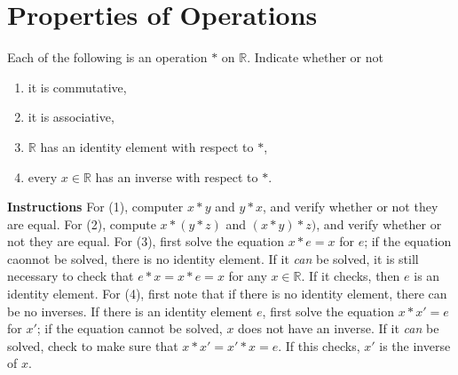 \documentclass[draft,twoside]{amsart}
\newcommand{\Reals}{\mathbb{R}{}}
\begin{document}
\section{Properties of Operations}

Each of the following is an operation $*$ on $\Reals$. Indicate whether or
not
\begin{enumerate}
   \item it is commutative,
   \item it is associative,
   \item $\Reals$ has an identity element with respect to $*$,
   \item every $x \in \Reals$ has an inverse with respect to $*$.
\end{enumerate}

\textbf{Instructions} For (1), computer $x * y$ and $y * x$, and verify whether
or not they are equal. For (2), compute $x * (y * z)$ and $(x * y) * z)$, and
verify whether or not they are equal. For (3), first solve the equation
$x * e = x$ for $e$; if the equation caonnot be solved, there is no identity
element. If it \emph{can} be solved, it is still necessary to check that
$e*x=x*e=x$ for any $x\in \Reals$. If it checks, then $e$ is an identity
element. For (4), first note that if there is no identity element, there can
be no inverses. If there is an identity element $e$, first solve the
equation $x*x'=e$ for $x'$; if the equation cannot be solved, $x$ does 
not have an inverse. If it \emph{can} be solved, check to make sure that
$x*x'=x'*x=e$. If this checks, $x'$ is the inverse of $x$.
\end{document}
